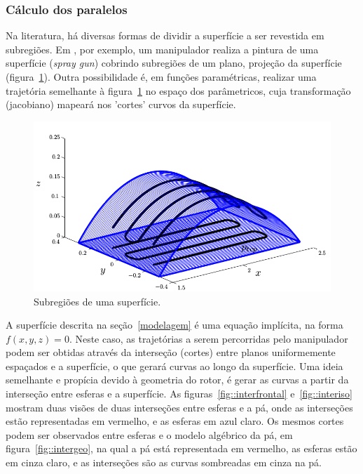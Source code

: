 \subsubsection{Cálculo dos paralelos}
Na literatura, há diversas formas de dividir a superfície a ser revestida em
subregiões. Em \cite{from2010off}, por exemplo, um manipulador realiza a pintura
de uma superfície (\textit{spray gun}) cobrindo subregiões de um plano, projeção
da superfície (figura~\ref{fig::pal}). Outra possibilidade é, em funções
paramétricas, realizar uma trajetória semelhante à figura~\ref{fig::pal} no
espaço dos parâmetricos, cuja transformação (jacobiano) mapeará nos 'cortes' curvos da
superfície.

\begin{figure}[!ht]
	\centering	
	\includegraphics[width=\columnwidth]{figs/planejamento/pal.png}
	\caption{Subregiões de uma superfície.}
	\label{fig::pal}
\end{figure}


A superfície descrita na seção~\ref{modelagem} é uma equação implícita, na forma
$f(x,y,z)=0$. Neste caso, as trajetórias a serem percorridas pelo manipulador
podem ser obtidas através da interseção (cortes) entre planos uniformemente
espaçados e a superfície, o que gerará curvas ao longo da superfície. Uma ideia
semelhante e propícia devido à geometria do rotor, é gerar as curvas a partir da interseção
entre esferas e a superfície. As figuras~\ref{fig::interfrontal}
e~\ref{fig::interiso} mostram duas visões de duas interseções entre esferas e
a pá, onde as interseções estão representadas em vermelho, e as esferas em
azul claro. Os mesmos cortes podem ser observados entre esferas e o modelo
algébrico da pá, em figura~\ref{fig::intergeo}, na qual a pá está representada
em vermelho, as esferas estão em cinza claro, e as interseções são as curvas
sombreadas em cinza na pá.


